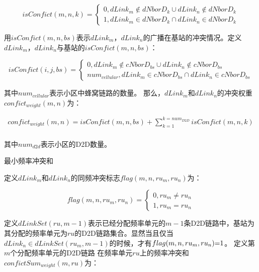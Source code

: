 \documentclass[figurelist,tablelist,algorithmlist,nomlist,masters]{seuthesix}
\begin{document}
	\begin{equation}\label{eq2.1}
	isConfict(m,n,k) = \left\{ \begin{array}{l}
	0,dLink_m \notin dNborD_k \cup dLink_n \notin dNborD_k\\
	1,dLink_m \in dNborD_k \cap dLink_n \in dNborD_k
	\end{array} \right.
	\end{equation}
	
	用$isConfict(m,n,bs)$表示$dLink_m$，$dLink_n$的广播在基站的冲突情况。定义$dLink_m$，$dLink_n$与基站的$isConfict(m,n,bs)$：
	
	\begin{equation}\label{eq2.1}
	isConfict(i,j,bs) = \left\{ \begin{array}{l} 0,dLink_m \notin cNborD_{bs} \cup dLink_n \notin cNborD_{bs}\\nu{m_{cellular}},dLink_m \in cNborD_{bs} \cap dLink_n \in cNborD_{bs} \end{array} \right.
	\end{equation}
	
	其中$nu{m_{cellular}}$表示小区中蜂窝链路的数量。
	那么，$dLink_m$和$dLink_n$的冲突权重$confic{t_{weight}}(m,n)$为：
	
	\begin{equation}\label{eq2.1}
	\begin{array}{l}
	confic{t_{weight}}(m,n) = isConfict(m,n,bs) + \sum\limits_{k = 1}^{k = nu{m_{D2D}}} {isConfict(m,n,k)} \\\end{array}
	\end{equation}
	
	
	其中$nu{m_{d2d}}$表示小区的D2D数量。
	
	最小频率冲突和
	
	定义$dLink_m$和$dLink_n$的同频冲突标志$flag(m,n,r{u_m},r{u_n})$为：
	
	\begin{equation}\label{eq2.1}
	flag(m,n,r{u_m},r{u_n}) = \left\{ \begin{array}{l} 0,r{u_m} \ne r{u_n}\\1,r{u_m} = r{u_n}\end{array} \right.
	\end{equation}
	
	定义$dLinkSet(ru,m - 1)$表示已经分配频率单元的$m-1$条D2D链路中，基站为其分配的频率单元为$ru$的D2D链路集合。显然当且仅当$dLink_n \in dLinkSet(r{u_m},m - 1)$的时候，才有$flag(m,n,r{u_m},r{u_n}){\rm{ = }}1$。
	定义第$m$个分配频率单元的D2D链路 在频率单元$ru$上的频率冲突和$confictSu{m_{weight}}(m,ru)$为：
	
\end{document}
